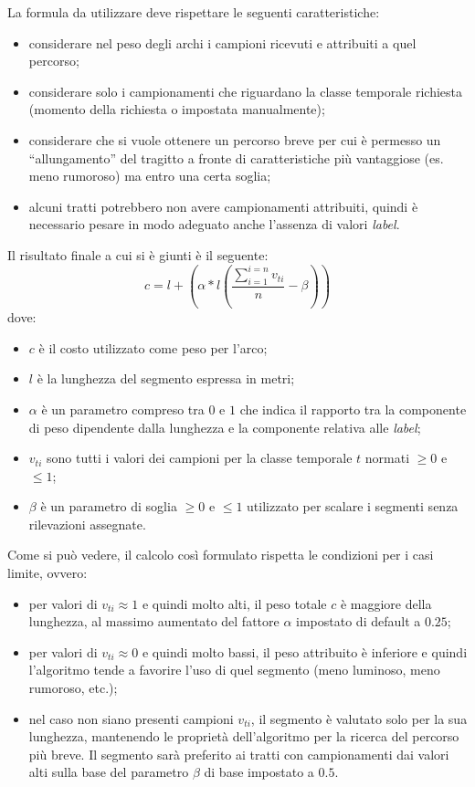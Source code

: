La formula da utilizzare deve rispettare le seguenti caratteristiche:
\begin{itemize}
\item considerare nel peso degli archi i campioni ricevuti e attribuiti a quel percorso;
\item considerare solo i campionamenti che riguardano la classe temporale richiesta (momento della richiesta o impostata manualmente);
\item considerare che si vuole ottenere un percorso breve per cui è permesso un ``allungamento'' del tragitto a fronte di caratteristiche più vantaggiose (es. meno rumoroso) ma entro una certa soglia;
\item alcuni tratti potrebbero non avere campionamenti attribuiti, quindi è necessario pesare in modo adeguato anche l'assenza di valori \emph{label}. 
\end{itemize}
Il risultato finale a cui si è giunti è il seguente:
$$ c=l+(\alpha * l (\frac{\sum\limits_{i=1}^{i=n}v_{ti}}{n}-\beta)) $$
dove:
\begin{itemize}
\item $c$ è il costo utilizzato come peso per l'arco;
\item $l$ è la lunghezza del segmento espressa in metri;
\item $\alpha$ è un parametro compreso tra $0$ e $1$ che indica il rapporto tra la componente di peso dipendente dalla lunghezza e la componente relativa alle \emph{label};
\item $v_{ti}$ sono tutti i valori dei campioni per la classe temporale $t$ normati $\geq0$ e $\leq1$;
\item $\beta$ è un parametro di soglia $\geq0$ e $\leq1$ utilizzato per scalare i segmenti senza rilevazioni assegnate.
\end{itemize}

Come si può vedere, il calcolo così formulato rispetta le condizioni per i casi limite, ovvero:
\begin{itemize}
\item per valori di $v_{ti} \approx 1$ e quindi molto alti, il peso totale $c$ è maggiore della lunghezza, al massimo aumentato del fattore $\alpha$ impostato di default a $0.25$;
\item per valori di $v_{ti} \approx 0$ e quindi molto bassi, il peso attribuito è inferiore e quindi l'algoritmo tende a favorire l'uso di quel segmento (meno luminoso, meno rumoroso, etc.);
\item nel caso non siano presenti campioni $v_{ti}$, il segmento è valutato solo per la sua lunghezza, mantenendo le proprietà dell'algoritmo per la ricerca del percorso più breve. Il segmento sarà preferito ai tratti con campionamenti dai valori alti sulla base del parametro $\beta$ di base impostato a $0.5$.
\end{itemize}

